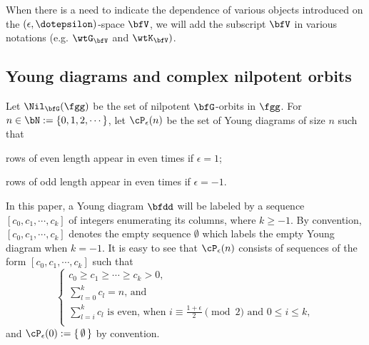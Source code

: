 \documentclass[12pt,a4paper]{amsart}
\makeatletter
\def\inn#1#2{\left\langle
      \def\ta{#1}\def\tb{#2}
      \ifx\ta\@empty{\;} \else {\ta}\fi ,
      \ifx\tb\@empty{\;} \else {\tb}\fi
      \right\rangle}
\numberwithin{equation}{section}
\theoremstyle{remark}
\makeatother
\begin{document}
 When there is a need to indicate the dependence of various objects introduced on the
 $(\epsilon,\dotepsilon)$-space $\bfV$, we will add the subscript $\bfV$ in various
 notations (e.g. $\wtG_{\bfV}$ and $\wtK_{\bfV})$.



\subsection{Young diagrams and complex nilpotent orbits}

Let $\Nil_{\bfG}(\fgg)$ be the set of nilpotent $\bfG$-orbits in $\fgg$.
For $n\in \bN:=\{ 0, 1,2, \cdots\}$, let $\cP_\epsilon(n)$ be the set of Young diagrams of size $n$ such that
\begin{enumI}
\item rows of even length appear in even times if $\epsilon=1$;
\item rows of odd length appear in even times if $\epsilon=-1$.
\end{enumI}



In this paper, a Young diagram $\bfdd$ will be labeled by a sequence
$[c_0,c_1,\cdots, c_k]$ of integers enumerating its columns, where $k\geq
-1$. By convention, $[c_0,c_1,\cdots,c_k]$ denotes the empty sequence $\emptyset$ which
labels the empty Young diagram when $k=-1$. It is easy to see that
$\cP_{\epsilon}(n)$ consists of sequences of the form $[c_0,c_1,\cdots, c_k]$
such that
\[%
\label{eq:P_eps}
\begin{cases}
  c_0\geq c_1\geq \cdots \geq c_k>0,\\
  \sum_{l=0}^k  c_l=n \text{, and} \\
  \sum_{l=i}^k  c_l \text{ is even, when $i\equiv \frac{1+\epsilon}{2} \pmod{2}$ and
  $0\leq i\leq k$},\\
\end{cases}
\]%
and $\cP_{\epsilon}(0) := \set{\emptyset}$ by convention.
\end{document}
